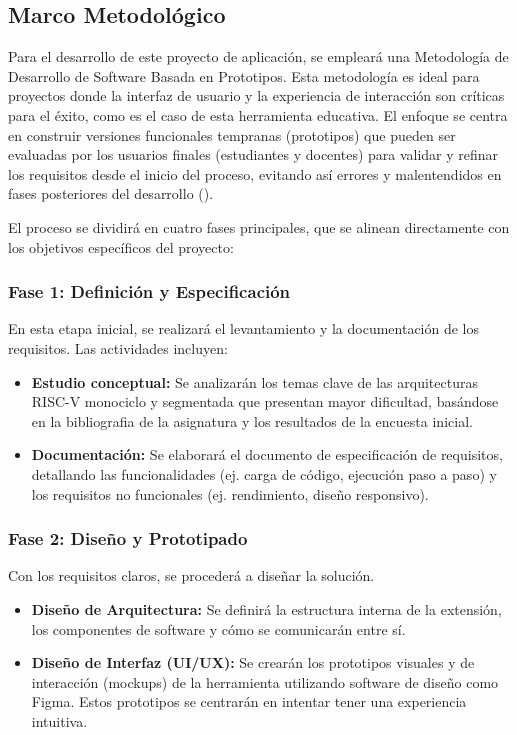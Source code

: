 \documentclass[12pt, letterpaper]{article}
\begin{document}
\subsection{Marco Metodológico}
Para el desarrollo de este proyecto de aplicación, se empleará una Metodología de Desarrollo de Software Basada en Prototipos. Esta metodología es ideal para proyectos donde la interfaz de usuario y la experiencia de interacción son críticas para el éxito, como es el caso de esta herramienta educativa. El enfoque se centra en construir versiones funcionales tempranas (prototipos) que pueden ser evaluadas por los usuarios finales (estudiantes y docentes) para validar y refinar los requisitos desde el inicio del proceso, evitando así errores y malentendidos en fases posteriores del desarrollo (\cite{yang2019}).

El proceso se dividirá en cuatro fases principales, que se alinean directamente con los objetivos específicos del proyecto:

\subsubsection{Fase 1: Definición y Especificación}
En esta etapa inicial, se realizará el levantamiento y la documentación de los requisitos. Las actividades incluyen:
\begin{itemize}
    \item \textbf{Estudio conceptual:} Se analizarán los temas clave de las arquitecturas RISC-V monociclo y segmentada que presentan mayor dificultad, basándose en la bibliografia de la asignatura y los resultados de la encuesta inicial.
    \item \textbf{Documentación:} Se elaborará el documento de especificación de requisitos, detallando las funcionalidades (ej. carga de código, ejecución paso a paso) y los requisitos no funcionales (ej. rendimiento, diseño responsivo).
\end{itemize}

\subsubsection{Fase 2: Diseño y Prototipado}
Con los requisitos claros, se procederá a diseñar la solución.
\begin{itemize}
    \item \textbf{Diseño de Arquitectura:} Se definirá la estructura interna de la extensión, los componentes de software y cómo se comunicarán entre sí.
    \item \textbf{Diseño de Interfaz (UI/UX):} Se crearán los prototipos visuales y de interacción (mockups) de la herramienta utilizando software de diseño como Figma. Estos prototipos se centrarán en intentar tener una experiencia intuitiva.
\end{itemize}
\end{document}
